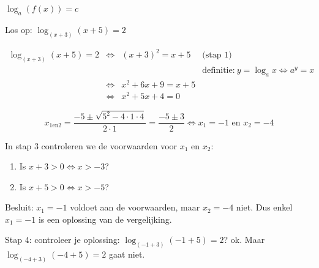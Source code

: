 \begin{voorbeeld}
$ \log_{a}\left(f(x)\right)=c$

Los op: $ \log_{(x+3)}(x+5)=2$

\begin{equation*}
 \begin{array}{rclr}
 \log_{(x+3)}(x+5)=2 & 
	\iff & (x+3)^{2} = x+5 & \text{(stap 1)} \\
	& & & \textrm{definitie:}\: y=\log_{a}x\Leftrightarrow a^{y}=x\\
	&\iff & x^{2}+6x+9 = x+5 & \text{}\\
	&\iff & x^{2}+5x+4 = 0 & 
	\end{array}
\end{equation*}


\begin{equation*}
x_{1\textrm{en}2}=\frac{-5\pm\sqrt{5^{2}-4\cdot 1\cdot 4}}{2\cdot 1}=\frac{-5\pm3}{2}\iff x_{1}=-1
\text{ en }x_{2}=-4
\end{equation*}

In stap 3 controleren we de voorwaarden voor $x_{1}$ en $x_{2}$:

\begin{enumerate}
	\item Is $x+3>0\iff x>-3$? 
	\item Is $x+5>0\iff x>-5$?
\end{enumerate}

Besluit: $ x_{1}=-1$ voldoet aan de voorwaarden, maar
$ x_{2}=-4$ niet. Dus enkel $ x_{1}=-1$
is een oplossing van de vergelijking.

Stap 4: controleer je oplossing: $ \log_{(-1+3)}(-1+5)=2$?
ok. Maar $ \log_{(-4+3)}(-4+5)=2$ gaat niet.

\end{voorbeeld}

